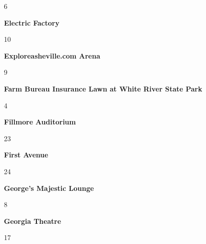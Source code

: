 \begin{center}6\end{center} 
\newline 
\begin{center}\textbf{Electric Factory}\end{center}
\begin{center}10\end{center} 
\newline 
\begin{center}\textbf{Exploreasheville.com Arena}\end{center}
\begin{center}9\end{center} 
\newline 
\begin{center}\textbf{Farm Bureau Insurance Lawn at White River State Park}\end{center}
\begin{center}4\end{center} 
\newline 
\begin{center}\textbf{Fillmore Auditorium}\end{center}
\begin{center}23\end{center} 
\newline 
\begin{center}\textbf{First Avenue}\end{center}
\begin{center}24\end{center} 
\newline 
\begin{center}\textbf{George's Majestic Lounge}\end{center}
\begin{center}8\end{center} 
\newline 
\begin{center}\textbf{Georgia Theatre}\end{center}
\begin{center}17\end{center} 
